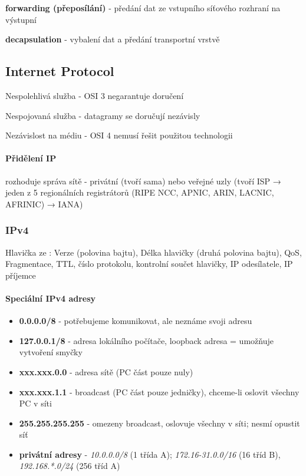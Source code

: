 \documentclass[10pt,a4paper]{article}
\begin{document}
\textbf{forwarding (přeposílání)} - předání dat ze vstupního síťového rozhraní na výstupní

\textbf{decapsulation} - vybalení dat a předání transportní vrstvě

\subsection{Internet Protocol}

Nespolehlivá služba - OSI 3 negarantuje doručení

Nespojovaná služba - datagramy se doručují nezávisly

Nezávislost na médiu - OSI 4 nemusí řešit použitou technologii

\paragraph{Přidělení IP} rozhoduje správa sítě - privátní (tvoří sama) nebo veřejné uzly (tvoří ISP → jeden z 5 regionálních registrátorů (RIPE NCC, APNIC, ARIN, LACNIC, AFRINIC) → IANA)

\subsubsection{IPv4}

Hlavička ze : Verze (polovina bajtu), Délka hlavičky (druhá polovina bajtu), QoS, Fragmentace, TTL, číslo protokolu, kontrolní součet hlavičky, IP odesílatele, IP příjemce

\paragraph{Speciální IPv4 adresy}

\begin{itemize}
    \item \textbf{0.0.0.0/8} - potřebujeme komunikovat, ale neznáme svoji adresu
    \item \textbf{127.0.0.1/8} - adresa lokálního počítače, loopback adresa = umožňuje vytvoření smyčky
    \item \textbf{xxx.xxx.0.0} - adresa sítě (PC část pouze nuly)
    \item \textbf{xxx.xxx.1.1} - broadcast (PC část pouze jedničky), chceme-li oslovit všechny PC v síti
    \item \textbf{255.255.255.255} - omezeny broadcast, oslovuje všechny v síti; nesmí opustit síť
\item \textbf{privátní adresy} - \textit{10.0.0.0/8} (1 třída A); \textit{172.16-31.0.0/16} (16 tříd B), \textit{192.168.*.0/24} (256 tříd A)
\end{itemize}
\end{document}
